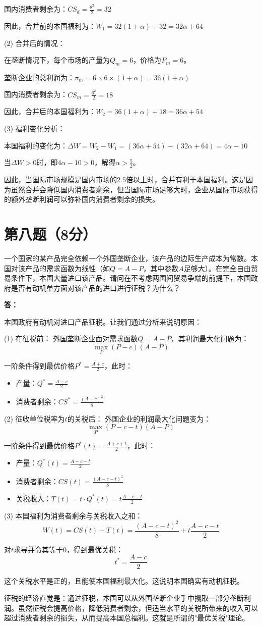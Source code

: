 \documentclass[12pt]{article}
\begin{document}
国内消费者剩余为：$CS_d = \frac{8^2}{2} = 32$

因此，合并前的本国福利为：$W_1 = 32(1+\alpha) + 32 = 32\alpha + 64$

(2) 合并后的情况：

在垄断情况下，每个市场的产量为$Q_m=6$，价格为$P_m=6$。

垄断企业的总利润为：$\pi_m = 6 \times 6 \times (1+\alpha) = 36(1+\alpha)$

国内消费者剩余为：$CS_m = \frac{6^2}{2} = 18$

因此，合并后的本国福利为：$W_2 = 36(1+\alpha) + 18 = 36\alpha + 54$

(3) 福利变化分析：

本国福利的变化为：$\Delta W = W_2 - W_1 = (36\alpha + 54) - (32\alpha + 64) = 4\alpha - 10$

当$\Delta W > 0$时，即$4\alpha - 10 > 0$，解得$\alpha > \frac{5}{2}$。

因此，当国际市场规模是国内市场的2.5倍以上时，合并有利于本国福利。这是因为虽然合并会降低国内消费者剩余，但当国际市场足够大时，企业从国际市场获得的额外垄断利润可以弥补国内消费者剩余的损失。

\section*{第八题（8分）}
一个国家的某产品完全依赖一个外国垄断企业，该产品的边际生产成本为常数。本国对该产品的需求函数为线性（如$Q=A-P$，其中参数$A$足够大）。在完全自由贸易条件下，本国大量进口该产品。请问在不考虑两国间贸易争端的前提下，本国政府是否有动机单方面对该产品的进口进行征税？为什么？

\noindent \textbf{答：}

本国政府有动机对进口产品征税。让我们通过分析来说明原因：

(1) 在征税前：
外国垄断企业面对需求函数$Q=A-P$，其利润最大化问题为：
\[\max_P (P-c)(A-P)\]

一阶条件得到最优价格$P^*=\frac{A+c}{2}$，此时：
\begin{itemize}
\item 产量：$Q^*=\frac{A-c}{2}$
\item 消费者剩余：$CS^*=\frac{(A-c)^2}{8}$
\end{itemize}

(2) 征收单位税率为$t$的关税后：
外国企业的利润最大化问题变为：
\[\max_P (P-c-t)(A-P)\]

一阶条件得到最优价格$P^*(t)=\frac{A+c+t}{2}$，此时：
\begin{itemize}
\item 产量：$Q^*(t)=\frac{A-c-t}{2}$
\item 消费者剩余：$CS(t)=\frac{(A-c-t)^2}{8}$
\item 关税收入：$T(t)=t\cdot Q^*(t)=t\frac{A-c-t}{2}$
\end{itemize}

(3) 本国福利为消费者剩余与关税收入之和：
\[W(t)=CS(t)+T(t)=\frac{(A-c-t)^2}{8}+t\frac{A-c-t}{2}\]

对$t$求导并令其等于0，得到最优关税：
\[t^*=\frac{A-c}{2}\]

这个关税水平是正的，且能使本国福利最大化。这说明本国确实有动机征税。

征税的经济直觉是：通过征税，本国可以从外国垄断企业手中攫取一部分垄断利润。虽然征税会提高价格，降低消费者剩余，但适当水平的关税所带来的收入可以超过消费者剩余的损失，从而提高本国总福利。这就是所谓的"最优关税"理论。
\end{document}
